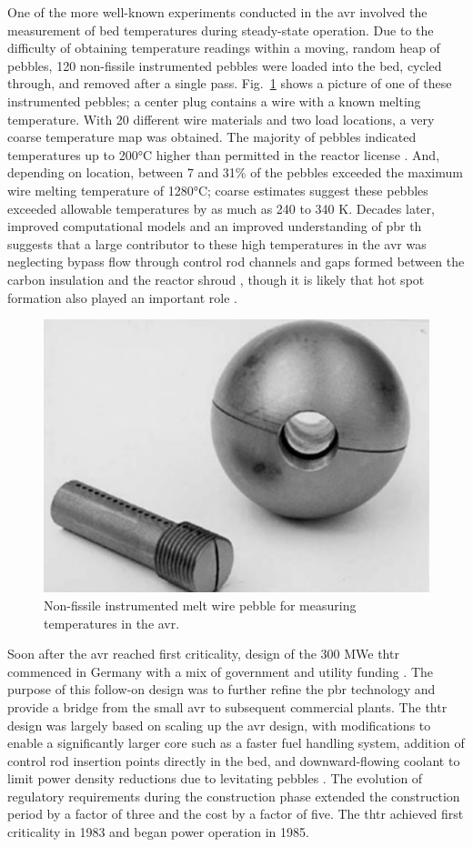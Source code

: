 One of the more well-known experiments conducted in the \gls{avr} involved the measurement of bed temperatures during steady-state operation. Due to the difficulty of obtaining temperature readings within a moving, random heap of pebbles, 120 non-fissile instrumented pebbles were loaded into the bed, cycled through, and removed after a single pass. Fig.\ \ref{fig:avr_melt} shows a picture of one of these instrumented pebbles; a center plug contains a wire with a known melting temperature. With 20 different wire materials and two load locations, a very coarse temperature map was obtained. The majority of pebbles indicated temperatures up to 200\si{\celsius} higher than permitted in the reactor license \cite{sobes,moormann}. And, depending on location, between 7 and 31\% of the pebbles exceeded the maximum wire melting temperature of 1280\si{\celsius}; coarse estimates suggest these pebbles exceeded allowable temperatures by as much as 240 to 340 K. %
 Decades later, improved computational models and an improved understanding of \gls{pbr} \gls{th} suggests that a large contributor to these high temperatures in the \gls{avr} was neglecting bypass flow through control rod channels and gaps formed between the carbon insulation and the reactor shroud \cite{viljoen}, though it is likely that hot spot formation also played an important role \cite{moormann}.

\begin{figure}[!h]
\centering
\includegraphics[width=0.4\linewidth]{figs/avr_melt_wire.png}
\caption{Non-fissile instrumented melt wire pebble for measuring temperatures in the \gls{avr}.}
\label{fig:avr_melt}
\end{figure}

Soon after the \gls{avr} reached first criticality, design of the 300 MWe \gls{thtr} commenced in Germany with a mix of government and utility funding \cite{oehme,thtr_1990,hecker,hofmann}. The purpose of this follow-on design was to further refine the \gls{pbr} technology and provide a bridge from the small \gls{avr} to subsequent commercial plants. The \gls{thtr} design was largely based on scaling up the \gls{avr} design, with modifications to enable a significantly larger core such as a faster fuel handling system, addition of control rod insertion points directly in the bed, and downward-flowing coolant to limit power density reductions due to levitating pebbles \cite{claxton}. The evolution of regulatory requirements during the construction phase extended the construction period by a factor of three and the cost by a factor of five. The \gls{thtr} achieved first criticality in 1983 and began power operation in 1985. 

